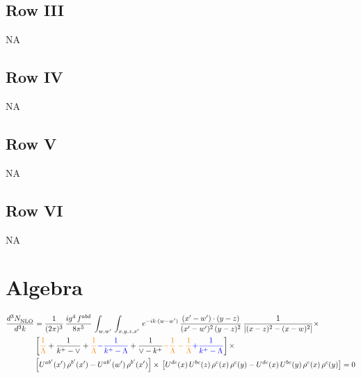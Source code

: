 \documentclass[9pt]{article}
\numberwithin{equation}{section}
\begin{document}
 \subsection{Row III}
 \textsc{NA}
\subsection{Row IV}
\textsc{NA}
\subsection{Row V}
\textsc{NA}
\subsection{Row VI}
\textsc{NA}
\section{Algebra}
\begin{align}
   \frac{d^{3}N_{\rm NLO}^{\rm}}{d^{3}k}  & = \frac{1}{(2\pi)^{3}}\,\frac{ig^{4}\,f^{abd}}{8\pi^{5}}\,\int_{w,w'}\,\int_{x,y,z,x'}\, e^{-ik\cdot(w-w^\prime)}\,\frac{(x'-w')\cdot (y-z)}{(x'-w')^{2}\,(y-z)^{2}}\, \frac{1}{\left[(x-z)^{2}-(x-w)^{2}\right]}\times\,\notag \\ &  \left[{\color{orange}\frac{1}{\Lambda}}+\frac{1}{k^{+}-\vee}+{\color{orange}\frac{1}{\Lambda}}{\color{blue}-\frac{1}{k^{+}-\Lambda}}+\frac{1}{\vee - k^{+}}{\color{orange}-\frac{1}{\Lambda}-\frac{1}{\Lambda}}{\color{blue}+\frac{1}{k^{+}-\Lambda}}\right]\times\notag \\ & \left[U^{ab'}(x')\,\rho^{b'}(x')-U^{ab'}(w')\, \rho^{b'}(x')\right]\times\, \left[U^{de}(x)\,U^{bc}(z)\, \rho^{e}(x)\,\rho^{c}(y)-U^{de}(x)\,U^{bc}(y)\,\rho^{e}(x)\,\rho^{c}(y)\right]  = 0
\end{align}
\end{document}
